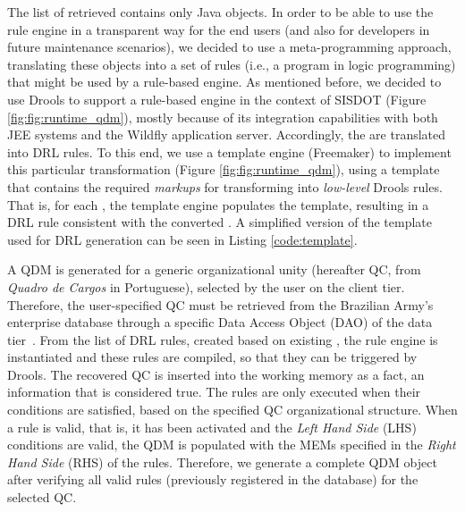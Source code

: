 The list of retrieved \callers contains only Java objects. 
In order to be able to use the rule engine in a transparent way for the end users 
(and also for developers in future maintenance scenarios), we decided to use a 
meta-programming approach, translating these objects into a set of rules (i.e., a program in 
logic programming) that might be used by a rule-based engine. As mentioned before,  
we decided to use Drools to support a rule-based engine in the context of 
SISDOT (Figure \ref{fig:fig:runtime_qdm}), mostly because of its integration capabilities 
with both JEE systems and the Wildfly application server. Accordingly,  
the \callers are translated into DRL rules. To this end, we use a template engine (Freemaker) 
to implement this particular transformation (Figure \ref{fig:fig:runtime_qdm}), using a template 
that contains the required \emph{markups} for transforming \shc into \emph{low-level} Drools 
rules. That is, for each \shc, the template engine populates the template, 
resulting in a DRL rule consistent with the converted \shc.
{\color{red}A simplified version of the template used for DRL generation can be seen in} Listing \ref{code:template}.



A QDM is generated for a generic organizational unity (hereafter QC, from \emph{Quadro de Cargos} in Portuguese), 
selected by the user on the client tier. 
Therefore, the user-specified QC must be retrieved from the Brazilian Army's enterprise database  
through a specific Data Access Object (DAO) of the data tier~\cite{alur2003}.
From the list of DRL rules, created based on existing \callers, the rule engine is instantiated and these rules are compiled, 
so that they can be triggered by Drools. The recovered QC is inserted into the working memory as a fact,  an 
information that is considered true. The rules are only executed when their conditions are satisfied, 
based on the specified QC organizational structure. When a rule is valid, that is, it has been activated 
and the \emph{Left Hand Side} (LHS) conditions are valid, 
the QDM is populated with the MEMs specified in the \emph{Right Hand Side} (RHS) of the rules. Therefore, we generate a 
complete QDM object after verifying all valid rules (previously registered in the database) for 
the selected QC. 



